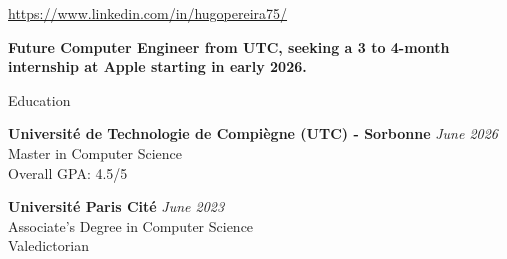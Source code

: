 \documentclass[
	10pt,
]{style} %
\begin{document}
\begin{center}
	\url{https://www.linkedin.com/in/hugopereira75/}
\end{center}

\begin{center}
	\textbf{Future Computer Engineer from UTC, seeking a 3 to 4-month internship at Apple starting in early 2026.}
\end{center}


\begin{rSection}{Education}
	
	\textbf{Université de Technologie de Compiègne (UTC) - Sorbonne} \hfill \textit{June 2026} \\
	Master in Computer Science \\
	Overall GPA: 4.5/5


	\textbf{Université Paris Cité} \hfill \textit{June 2023} \\
	Associate's Degree in Computer Science \\
	Valedictorian

\end{rSection}

\end{document}
